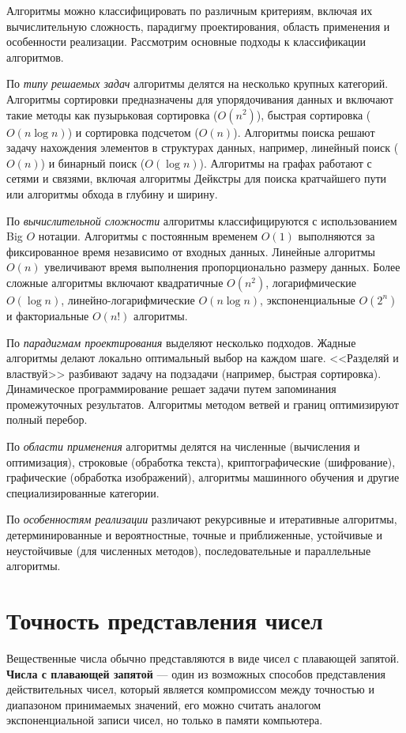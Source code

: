 Алгоритмы можно классифицировать по различным критериям, включая их вычислительную сложность, парадигму проектирования, область применения и особенности реализации. Рассмотрим основные подходы к классификации алгоритмов.

По \textit{типу решаемых задач} алгоритмы делятся на несколько крупных категорий. 
Алгоритмы сортировки предназначены для упорядочивания данных и включают такие 
методы как пузырьковая сортировка ($O(n^2)$), быстрая сортировка ($O(n \log{n})$) и 
сортировка подсчетом ($O(n)$). Алгоритмы поиска решают задачу нахождения 
элементов в структурах данных, например, линейный поиск ($O(n)$) и бинарный 
поиск ($O(\log n)$). Алгоритмы на графах работают с сетями и связями, включая 
алгоритмы Дейкстры для поиска кратчайшего пути или алгоритмы обхода в глубину 
и ширину.

По \textit{вычислительной сложности} алгоритмы классифицируются с использованием Big $O$ 
нотации. Алгоритмы с постоянным временем $O(1)$ выполняются за фиксированное 
время независимо от входных данных. Линейные алгоритмы $O(n)$ увеличивают время 
выполнения пропорционально размеру данных. Более сложные алгоритмы включают 
квадратичные $O(n^2)$, логарифмические $O(\log{n})$, линейно-логарифмические $O(n \log{n})$,
экспоненциальные $O(2^n)$ и факториальные $O(n!)$ алгоритмы.

По \textit{парадигмам проектирования} выделяют несколько подходов. Жадные 
алгоритмы делают локально оптимальный выбор на каждом шаге. <<Разделяй и 
властвуй>> разбивают задачу на подзадачи (например, быстрая сортировка). 
Динамическое программирование решает задачи путем запоминания промежуточных 
результатов. Алгоритмы методом ветвей и границ оптимизируют полный перебор.

По \textit{области применения} алгоритмы делятся на численные (вычисления и 
оптимизация), строковые (обработка текста), криптографические (шифрование), 
графические (обработка изображений), алгоритмы машинного обучения и другие 
специализированные категории.

По \textit{особенностям реализации} различают рекурсивные и итеративные 
алгоритмы, детерминированные и вероятностные, точные и приближенные, 
устойчивые и неустойчивые (для численных методов), последовательные и 
параллельные алгоритмы.

\section{Точность представления чисел}
Вещественные числа обычно представляются в виде чисел с плавающей запятой. 
\textbf{Числа с плавающей запятой} --- один из возможных способов представления 
действительных чисел, который является компромиссом между точностью и 
диапазоном принимаемых значений, его можно считать аналогом экспоненциальной 
записи чисел, но только в памяти компьютера.

